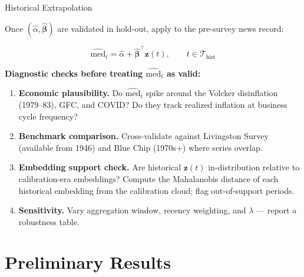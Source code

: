 \documentclass[aspectratio=169, 11pt]{beamer}
\newcommand{\med}{\mathrm{med}}
\newcommand{\zt}{\mathbf{z}(t)}
\newcommand{\bt}{\bm{\beta}}
\newcommand{\lam}{\lambda}
\begin{document}
\begin{frame}{Historical Extrapolation}

Once $(\hat{\alpha}, \hat{\bt})$ are validated in hold-out, apply to the pre-survey news record:

\[
  \widehat{\med}_t = \hat{\alpha} + \hat{\bt}^\top \zt, \qquad t \in \mathcal{T}_{\text{hist}}
\]

\vspace{0.3cm}
\textbf{Diagnostic checks before treating $\widehat{\med}_t$ as valid:}

\begin{enumerate}
  \item \textbf{Economic plausibility.} Do $\widehat{\med}_t$ spike around the Volcker disinflation (1979--83), GFC, and COVID? Do they track realized inflation at business cycle frequency?
  
  \item \textbf{Benchmark comparison.} Cross-validate against Livingston Survey (available from 1946) and Blue Chip (1970s+) where series overlap.

  \item \textbf{Embedding support check.} Are historical $\zt$ in-distribution relative to calibration-era embeddings? Compute the Mahalanobis distance of each historical embedding from the calibration cloud; flag out-of-support periods.

  \item \textbf{Sensitivity.} Vary aggregation window, recency weighting, and $\lam$ --- report a robustness table.
\end{enumerate}

\end{frame}

\section{Preliminary Results}
\end{document}
